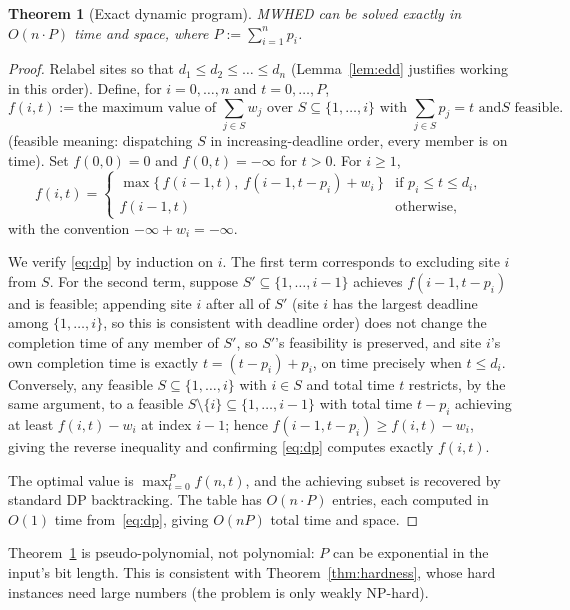 \documentclass[pdflatex,sn-mathphys-ay]{sn-jnl}
\theoremstyle{thmstyleone}
\newtheorem{theorem}{Theorem}
\theoremstyle{thmstyletwo}
\theoremstyle{thmstylethree}
\begin{document}
\begin{theorem}[Exact dynamic program]\label{thm:dp}
MWHED can be solved exactly in $O(n \cdot P)$ time and space, where
$P := \sum_{i=1}^n p_i$.
\end{theorem}

\begin{proof}
Relabel sites so that $d_1 \le d_2 \le \dots \le d_n$ (Lemma~\ref{lem:edd}
justifies working in this order). Define, for $i = 0,\dots,n$ and $t =
0,\dots,P$,
\[
f(i,t) := \text{the maximum value of } \sum_{j \in S} w_j \text{ over }
S \subseteq \{1,\dots,i\} \text{ with } \sum_{j\in S} p_j = t \text{ and
$S$ feasible.}
\]
(feasible meaning: dispatching $S$ in increasing-deadline order, every
member is on time). Set $f(0,0) = 0$ and $f(0,t) = -\infty$ for $t > 0$.
For $i \ge 1$,
\begin{equation}\label{eq:dp}
f(i,t)=\begin{cases}
\max\{\,f(i-1,t),\ f(i-1,t-p_i)+w_i\,\} & \text{if } p_i\le t\le d_i,\\[2pt]
f(i-1,t) & \text{otherwise,}
\end{cases}
\end{equation}
with the convention $-\infty+w_i=-\infty$.

We verify \eqref{eq:dp} by induction on $i$. The first term corresponds
to excluding site $i$ from $S$. For the second term, suppose $S'
\subseteq \{1,\dots,i-1\}$ achieves $f(i-1, t-p_i)$ and is feasible;
appending site $i$ after all of $S'$ (site $i$ has the largest deadline
among $\{1,\dots,i\}$, so this is consistent with deadline
order) does not change the completion time of any member of $S'$, so
$S'$'s feasibility is preserved, and site $i$'s own completion time is
exactly $t = (t - p_i) + p_i$, on time precisely when $t \le d_i$.
Conversely, any feasible $S \subseteq \{1,\dots,i\}$ with $i \in S$ and
total time $t$ restricts, by the same argument, to a feasible $S
\setminus \{i\} \subseteq \{1,\dots,i-1\}$ with total time $t - p_i$
achieving at least $f(i,t) - w_i$ at index $i-1$; hence $f(i-1,t-p_i)
\ge f(i,t) - w_i$, giving the reverse inequality and confirming
\eqref{eq:dp} computes exactly $f(i,t)$.

The optimal value is $\max_{t=0}^{P} f(n,t)$, and the achieving subset
is recovered by standard DP backtracking. The table has $O(n\cdot P)$
entries, each computed in $O(1)$ time from~\eqref{eq:dp}, giving
$O(nP)$ total time and space.
\end{proof}

Theorem~\ref{thm:dp} is pseudo-polynomial, not polynomial: $P$ can be
exponential in the input's bit length. This is consistent with
Theorem~\ref{thm:hardness}, whose hard instances need large numbers
(the problem is only weakly NP-hard).
\end{document}

